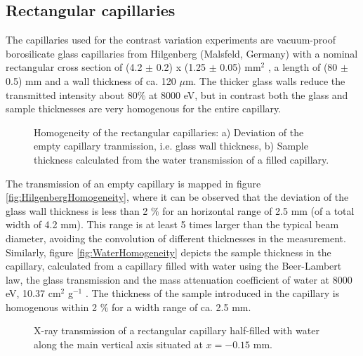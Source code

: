 \subsection{Rectangular capillaries}

The capillaries used for the contrast variation experiments are vacuum-proof borosilicate glass capillaries from Hilgenberg (Malsfeld, Germany) with a nominal rectangular cross section of (4.2 $\pm$ 0.2) x (1.25 $\pm$ 0.05) mm$^2$ , a length of (80 $\pm$ 0.5) mm and a wall thickness of ca. 120 $\mu$m. The thicker glass walls reduce the transmitted intensity about $80\%$ at 8000 eV, but in contrast both the glass and sample thicknesses are very homogenous for the entire capillary.

\begin{figure}%
	\centering
		\caption{Homogeneity of the rectangular capillaries: a) Deviation of the empty capillary tranmission, i.e. glass wall thickness, b) Sample thickness calculated from the water transmission of a filled capillary. }
\end{figure}

The transmission of an empty capillary is mapped in figure \ref{fig:HilgenbergHomogeneity}, where it can be observed that the deviation of the glass wall thickness is less than 2 $\%$ for an horizontal range of 2.5 mm (of a total width of 4.2 mm). This range is at least 5 times larger than the typical beam diameter, avoiding the convolution of different thicknesses in the measurement. Similarly, figure \ref{fig:WaterHomogeneity} depicts the sample thickness in the capillary, calculated from a capillary filled with water using the Beer-Lambert law, the glass transmission and the mass attenuation coefficient of water at 8000 eV, 10.37 cm$^{2}$ g$^{-1}$ \citep{hubbell_tables_1996}. The thickness of the sample introduced in the capillary is homogenous within 2 $\%$ for a width range of ca. 2.5 mm. 

\begin{figure}%
	\centering
		
		\caption{X-ray transmission of a rectangular capillary half-filled with water along the main vertical axis situated at $x=-0.15$ mm.}
		\label{fig:GaldenCalibration}
\end{figure}

